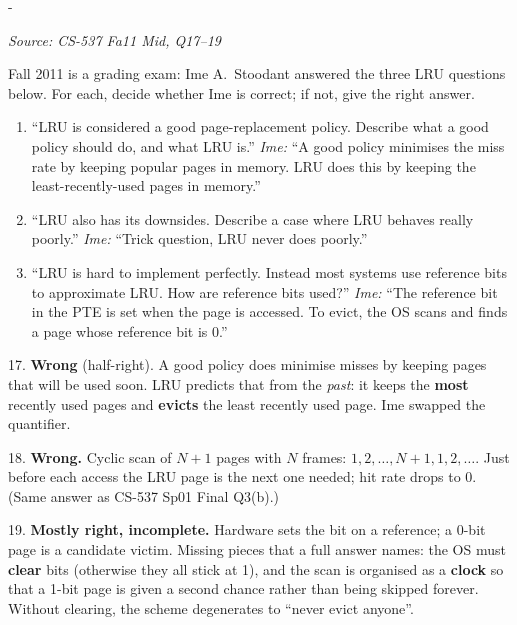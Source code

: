 \documentclass[11pt,a4paper]{article}
\makeatletter
\newcommand{\keepspace}[1]{\par\penalty-100\begingroup
  \setlength{\dimen@}{#1}\dimen@ii\pagegoal\advance\dimen@ii-\pagetotal
  \ifdim\dimen@>\dimen@ii\ifdim\dimen@ii>\z@\vfil\fi\break\fi\endgroup}
\newcounter{qn}[section]
\newenvironment{Qn}[4]{%
  \refstepcounter{qn}\keepspace{7\baselineskip}%
  \begin{tcolorbox}[qboxstyle, title={Q\thesection.\theqn\ \ [#1 \textbar\ #2]\ \ #4}]%
  {\footnotesize\color{g3}\textit{Source: #3}}\par\smallskip%
}{%
  \end{tcolorbox}%
}
\newenvironment{Sol}{%
  \begin{tcolorbox}[sboxstyle, title={Solution}]%
}{%
  \end{tcolorbox}\vspace{0.35em}%
}
\makeatother
\begin{document}
\begin{Qn}{Easy-Medium}{Lect 15}{CS-537 Fa11 Mid, Q17--19}{Grade Ime's LRU answers}
Fall 2011 is a grading exam: Ime A.\ Stoodant answered the three LRU
questions below. For each, decide whether Ime is correct; if not, give
the right answer.
\begin{enumerate}
  \item[17.] ``LRU is considered a good page-replacement policy. Describe
        what a good policy should do, and what LRU is.''
        \emph{Ime:} ``A good policy minimises the miss rate by keeping
        popular pages in memory. LRU does this by keeping the
        least-recently-used pages in memory.''
  \item[18.] ``LRU also has its downsides. Describe a case where LRU
        behaves really poorly.''
        \emph{Ime:} ``Trick question, LRU never does poorly.''
  \item[19.] ``LRU is hard to implement perfectly. Instead most systems
        use reference bits to approximate LRU. How are reference bits
        used?''
        \emph{Ime:} ``The reference bit in the PTE is set when the page
        is accessed. To evict, the OS scans and finds a page whose
        reference bit is 0.''
\end{enumerate}
\end{Qn}
\begin{Sol}
17. \textbf{Wrong} (half-right). A good policy does minimise misses by
keeping pages that will be used soon. LRU predicts that from the
\emph{past}: it keeps the \textbf{most} recently used pages and
\textbf{evicts} the least recently used page. Ime swapped the
quantifier.

18. \textbf{Wrong.} Cyclic scan of $N+1$ pages with $N$ frames:
$1,2,\ldots,N+1,1,2,\ldots$. Just before each access the LRU page is
the next one needed; hit rate drops to 0. (Same answer as CS-537 Sp01
Final Q3(b).)

19. \textbf{Mostly right, incomplete.} Hardware sets the bit on a
reference; a 0-bit page is a candidate victim. Missing pieces that a
full answer names: the OS must \textbf{clear} bits (otherwise they all
stick at 1), and the scan is organised as a \textbf{clock} so that a
1-bit page is given a second chance rather than being skipped forever.
Without clearing, the scheme degenerates to ``never evict anyone''.
\end{Sol}
\end{document}
